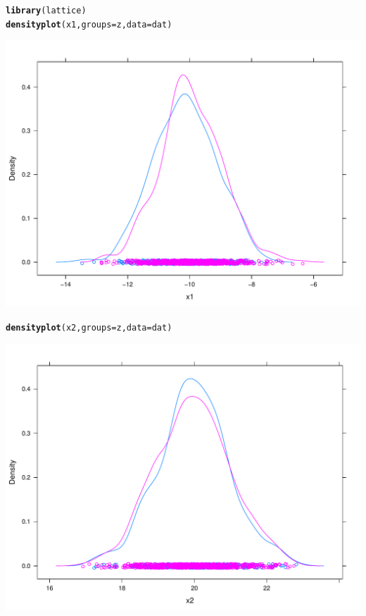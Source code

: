 \documentclass[onesided]{article}\usepackage[]{graphicx}\usepackage[]{color}
\makeatletter
\def\maxwidth{ %
  \ifdim\Gin@nat@width>\linewidth
    \linewidth
  \else
    \Gin@nat@width
  \fi
}
\newcommand{\hlstd}[1]{\textcolor[rgb]{0.345,0.345,0.345}{#1}}%
\newcommand{\hlkwc}[1]{\textcolor[rgb]{0.333,0.667,0.333}{#1}}%
\newcommand{\hlkwd}[1]{\textcolor[rgb]{0.737,0.353,0.396}{\textbf{#1}}}%
\newenvironment{kframe}{%
 \def\at@end@of@kframe{}%
 \ifinner\ifhmode%
  \def\at@end@of@kframe{\end{minipage}}%
  \begin{minipage}{\columnwidth}%
 \fi\fi%
 \def\FrameCommand##1{\hskip\@totalleftmargin \hskip-\fboxsep
 \colorbox{shadecolor}{##1}\hskip-\fboxsep
     \hskip-\linewidth \hskip-\@totalleftmargin \hskip\columnwidth}%
 \MakeFramed {\advance\hsize-\width
   \@totalleftmargin\z@ \linewidth\hsize
   \@setminipage}}%
 {\par\unskip\endMakeFramed%
 \at@end@of@kframe}
\newenvironment{knitrout}{}{} %
\makeatother
\begin{document}
\begin{knitrout}
\color{fgcolor}\begin{kframe}
\begin{alltt}
\hlkwd{library}\hlstd{(lattice)}
\hlkwd{densityplot}\hlstd{(x1,} \hlkwc{groups} \hlstd{= z,} \hlkwc{data} \hlstd{= dat)}
\end{alltt}
\end{kframe}

{\centering \includegraphics[width=\maxwidth]{figure/sim:3-1} 

}


\begin{kframe}\begin{alltt}
\hlkwd{densityplot}\hlstd{(x2,} \hlkwc{groups} \hlstd{= z,} \hlkwc{data} \hlstd{= dat)}
\end{alltt}
\end{kframe}

{\centering \includegraphics[width=\maxwidth]{figure/sim:3-2} 

}



\end{knitrout}
\end{document}
